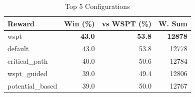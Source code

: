 \begin{table}[htbp]%
\centering%
\begin{tabular}{lrrr}%
\toprule%
\textbf{Reward}&\textbf{Win (\%)}&\textbf{vs WSPT (\%)}&\textbf{W. Sum}\\%
\midrule%
wspt&\textbf{43.0}&\textbf{53.8}&\textbf{12878}\\%
default&43.0&53.8&12778\\%
critical_path&40.0&50.6&12784\\%
wspt_guided&39.0&49.4&12806\\%
potential_based&39.0&50.0&12767\\%
\bottomrule%
\end{tabular}%
\caption{Top 5 Configurations}%
\label{tab:summary}%
\end{table}